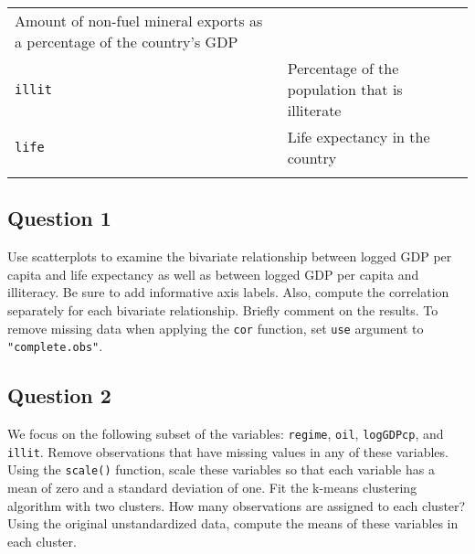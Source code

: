 \documentclass[]{article}
\begin{document}
\begin{longtable}[c]{@{}ll@{}}
\begin{minipage}[t]{0.68\columnwidth}
Amount of non-fuel mineral exports as a percentage of the country's GDP
\end{minipage}
\\\addlinespace
\begin{minipage}[t]{0.25\columnwidth}\raggedright
\texttt{illit}
\end{minipage} & \begin{minipage}[t]{0.68\columnwidth}\raggedright
Percentage of the population that is illiterate
\end{minipage}
\\\addlinespace
\begin{minipage}[t]{0.25\columnwidth}\raggedright
\texttt{life}
\end{minipage} & \begin{minipage}[t]{0.68\columnwidth}\raggedright
Life expectancy in the country
\end{minipage}
\\\addlinespace
\bottomrule
\end{longtable}

\subsection{Question 1}\label{question-1}

Use scatterplots to examine the bivariate relationship between logged
GDP per capita and life expectancy as well as between logged GDP per
capita and illiteracy. Be sure to add informative axis labels. Also,
compute the correlation separately for each bivariate relationship.
Briefly comment on the results. To remove missing data when applying the
\texttt{cor} function, set \texttt{use} argument to
\texttt{"complete.obs"}.

\subsection{Question 2}\label{question-2}

We focus on the following subset of the variables: \texttt{regime},
\texttt{oil}, \texttt{logGDPcp}, and \texttt{illit}. Remove observations
that have missing values in any of these variables. Using the
\texttt{scale()} function, scale these variables so that each variable
has a mean of zero and a standard deviation of one. Fit the k-means
clustering algorithm with two clusters. How many observations are
assigned to each cluster? Using the original unstandardized data,
compute the means of these variables in each cluster.
\end{document}
